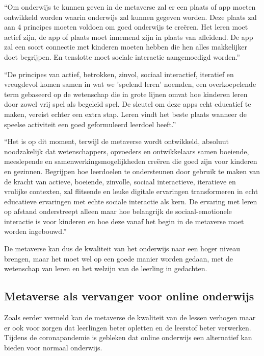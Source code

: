 \documentclass{hogent-article}
\begin{document}
``Om onderwijs te kunnen geven in de metaverse zal er een plaats of app moeten ontwikkeld worden waarin onderwijs zal kunnen gegeven worden. Deze plaats zal aan 4 principes moeten voldoen om goed onderwijs te creëren. Het leren moet actief zijn, de app of plaats moet innemend zijn in plaats van afleidend. De app zal een soort connectie met kinderen moeten hebben die hen alles makkelijker doet begrijpen. En tenslotte moet sociale interactie aangemoedigd worden.'' \autocite{HirshPasek2015}

``De principes van actief, betrokken, zinvol, sociaal interactief, iteratief en vreugdevol komen samen in wat we 'spelend leren' noemden, een overkoepelende term gebaseerd op de wetenschap die in grote lijnen omvat hoe kinderen leren door zowel vrij spel als begeleid spel. De sleutel om deze apps echt educatief te maken, vereist echter een extra stap. Leren vindt het beste plaats wanneer de speelse activiteit een goed geformuleerd leerdoel heeft.'' \autocite{HirshPasek2022}

``Het is op dit moment, terwijl de metaverse wordt ontwikkeld, absoluut noodzakelijk dat wetenschappers, opvoeders en ontwikkelaars samen boeiende, meeslepende en samenwerkingsmogelijkheden creëren die goed zijn voor kinderen en gezinnen. Begrijpen hoe leerdoelen te ondersteunen door gebruik te maken van de kracht van actieve, boeiende, zinvolle, sociaal interactieve, iteratieve en vrolijke contexten, zal flitsende en leuke digitale ervaringen transformeren in echt educatieve ervaringen met echte sociale interactie als kern. De ervaring met leren op afstand onderstreept alleen maar hoe belangrijk de sociaal-emotionele interactie is voor kinderen en hoe deze vanaf het begin in de metaverse moet worden ingebouwd.'' \autocite{HirshPasek2022} 

De metaverse kan dus de kwaliteit van het onderwijs naar een hoger niveau brengen, maar het moet wel op een goede manier worden gedaan, met de wetenschap van leren en het welzijn van de leerling in gedachten. 



\subsection{Metaverse als vervanger voor online onderwijs}
Zoals eerder vermeld kan de metaverse de kwaliteit van de lessen verhogen maar er ook voor zorgen dat leerlingen beter opletten en de leerstof beter verwerken. Tijdens de coronapandemie is gebleken dat online onderwijs een alternatief kan bieden voor normaal onderwijs. 
\end{document}
